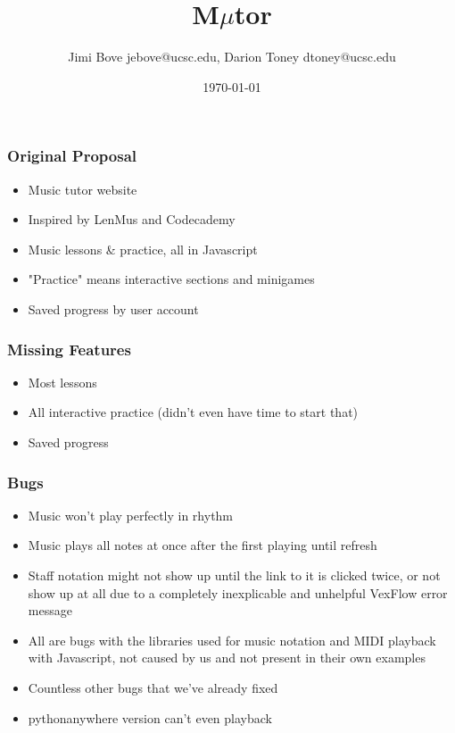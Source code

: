 \documentclass[24pt]{beamer}
\title{M$\mu$tor}
\author{Jimi Bove jebove@ucsc.edu, Darion Toney dtoney@ucsc.edu}
\date{\today}
\begin{document}
\maketitle

\begin{frame}
\frametitle{Original Proposal}
\begin{itemize}
  \item Music tutor website
  \item Inspired by LenMus and Codecademy
  \item Music lessons \& practice, all in Javascript
  \item "Practice" means interactive sections and minigames
  \item Saved progress by user account
\end{itemize}
\end{frame}

\begin{frame}
\frametitle{Missing Features}
\begin{itemize}
  \item Most lessons
  \item All interactive practice (didn't even have time to start that)
  \item Saved progress
\end{itemize}
\end{frame}

\begin{frame}
\frametitle{Bugs}
\begin{itemize}
  \item Music won't play perfectly in rhythm
  \item Music plays all notes at once after the first playing until refresh
  \item Staff notation might not show up until the link to it is clicked twice, or not show up at all due to a completely inexplicable and unhelpful VexFlow error message
  \item All are bugs with the libraries used for music notation and MIDI playback with Javascript, not caused by us and not present in their own examples
  \item Countless other bugs that we've already fixed
  \item pythonanywhere version can't even playback
\end{itemize}
\end{frame}
\end{document}
